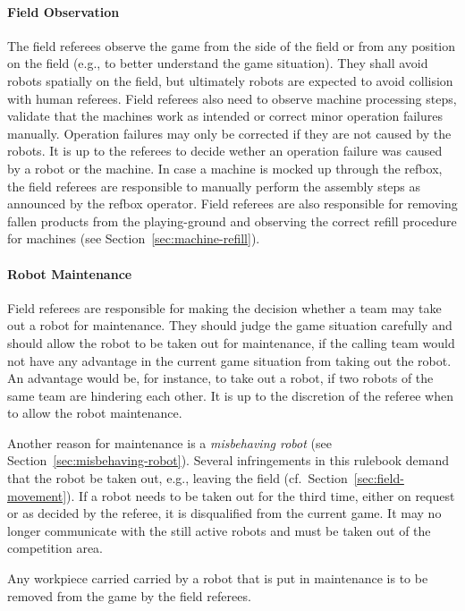 \documentclass[12pt,twoside]{article}
\newcommand{\refsec}[1]{Section~\ref{#1}}
\begin{document}
\paragraph{Field Observation}
The field referees observe the game from the side of the field or from
any position on the field (e.g., to better understand the game
situation). They shall avoid robots spatially on the field, but
ultimately robots are expected to avoid collision with human
referees.
Field referees also need to observe machine processing steps, validate that
the machines work as intended or correct minor operation failures manually.
Operation failures may only be corrected if they are not caused by the robots.
It is up to the referees to decide wether an operation failure was caused by
a robot or the machine.
In case a machine is mocked up through the \ac{refbox}, the field referees
are responsible to manually perform the assembly steps as announced by the
\ac{refbox} operator.
Field referees are also responsible for removing fallen
products from the playing-ground and observing the correct refill procedure
for machines (see \refsec{sec:machine-refill}).

\paragraph{Robot Maintenance}
Field referees are responsible for
making the decision whether a team may take out a robot for
maintenance.
They should judge the game situation carefully and should allow the
robot to be taken out for maintenance, if the calling team would not
have any advantage in the current game situation from taking out the
robot. An advantage would be, for instance, to take out a robot, if
two robots of the same team are hindering each other. It is up to the
discretion of the referee when to allow the robot maintenance.

Another reason for maintenance is a \emph{misbehaving robot}
(see \refsec{sec:misbehaving-robot}).
Several
infringements in this rulebook demand that the robot be taken out,
e.g., leaving the field (cf.~\refsec{sec:field-movement}).
If a robot needs to be taken out for the third time, either on
request or as decided by the referee, it is disqualified from the
current game. It may no longer communicate with the still active
robots and must be taken out of the competition area.

Any workpiece carried carried by a robot that is put in maintenance is to
be removed from the game by the field referees.
\end{document}
